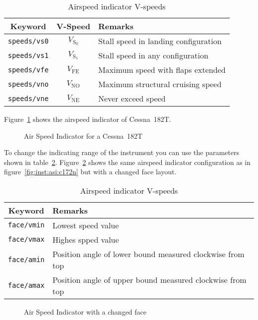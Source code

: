 \begin{table}
\centering
\begin{tabular}{ccl}
\toprule
Keyword             & V-Speed          & Remarks                              \\
\midrule
\texttt{speeds/vs0} & $V_\mathrm{S_0}$ & Stall speed in landing configuration \\
\texttt{speeds/vs1} & $V_\mathrm{S_1}$ & Stall speed in any configuration     \\
\texttt{speeds/vfe} & $V_\mathrm{FE}$  & Maximum speed with flaps extended    \\
\texttt{speeds/vno} & $V_\mathrm{NO}$  & Maximum structural cruising speed    \\
\texttt{speeds/vne} & $V_\mathrm{NE}$  & Never exceed speed                   \\
\bottomrule
\end{tabular}
\caption{Airspeed indicator V-speeds}
\label{tab:inst:asi:speeds}
\end{table}

Figure~\ref{fig:inst:asi:c182t} shows the airspeed indicator of Cessna~182T.

\begin{figure}[!h]
\centering
{}
\caption{Air Speed Indicator for a Cessna~182T}
\label{fig:inst:asi:c182t}
\end{figure}

To change the indicating range of the instrument you can use the parameters
shown in table~\ref{tab:inst:asi:range}. Figure~\ref{fig:inst:asi:range} shows
the same airspeed indicator configuration as in figure~\ref{fig:inst:asi:c172n}
but with a changed face layout.

\begin{table}
\centering
\begin{tabular}{cl}
\toprule
Keyword            & Remarks                                                   \\
\midrule
\texttt{face/vmin} & Lowest speed value                                        \\
\texttt{face/vmax} & Highes spped value                                        \\
\texttt{face/amin} & Position angle of lower bound measured clockwise from top \\
\texttt{face/amax} & Position angle of upper bound measured clockwise from top \\
\bottomrule
\end{tabular}
\caption{Airspeed indicator V-speeds}
\label{tab:inst:asi:range}
\end{table}

\begin{figure}[!h]
\centering
{}
\caption{Air Speed Indicator with a changed face}
\label{fig:inst:asi:range}
\end{figure}
